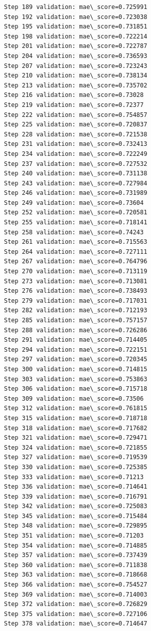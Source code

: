 \documentclass[11pt]{article}
\begin{document}
\begin{Verbatim}[commandchars=\\\{\}]
Step 189 validation: mae\_score=0.725991
Step 192 validation: mae\_score=0.723038
Step 195 validation: mae\_score=0.731851
Step 198 validation: mae\_score=0.722214
Step 201 validation: mae\_score=0.722787
Step 204 validation: mae\_score=0.736593
Step 207 validation: mae\_score=0.723243
Step 210 validation: mae\_score=0.738134
Step 213 validation: mae\_score=0.735702
Step 216 validation: mae\_score=0.73028
Step 219 validation: mae\_score=0.72377
Step 222 validation: mae\_score=0.754857
Step 225 validation: mae\_score=0.720837
Step 228 validation: mae\_score=0.721538
Step 231 validation: mae\_score=0.732413
Step 234 validation: mae\_score=0.722249
Step 237 validation: mae\_score=0.727532
Step 240 validation: mae\_score=0.731138
Step 243 validation: mae\_score=0.727984
Step 246 validation: mae\_score=0.731989
Step 249 validation: mae\_score=0.73604
Step 252 validation: mae\_score=0.720581
Step 255 validation: mae\_score=0.718141
Step 258 validation: mae\_score=0.74243
Step 261 validation: mae\_score=0.715563
Step 264 validation: mae\_score=0.727111
Step 267 validation: mae\_score=0.764796
Step 270 validation: mae\_score=0.713119
Step 273 validation: mae\_score=0.713081
Step 276 validation: mae\_score=0.738493
Step 279 validation: mae\_score=0.717031
Step 282 validation: mae\_score=0.712193
Step 285 validation: mae\_score=0.757157
Step 288 validation: mae\_score=0.726286
Step 291 validation: mae\_score=0.714405
Step 294 validation: mae\_score=0.722151
Step 297 validation: mae\_score=0.720345
Step 300 validation: mae\_score=0.714815
Step 303 validation: mae\_score=0.753863
Step 306 validation: mae\_score=0.715718
Step 309 validation: mae\_score=0.73506
Step 312 validation: mae\_score=0.761815
Step 315 validation: mae\_score=0.718718
Step 318 validation: mae\_score=0.717682
Step 321 validation: mae\_score=0.729471
Step 324 validation: mae\_score=0.721855
Step 327 validation: mae\_score=0.719539
Step 330 validation: mae\_score=0.725385
Step 333 validation: mae\_score=0.71213
Step 336 validation: mae\_score=0.714641
Step 339 validation: mae\_score=0.716791
Step 342 validation: mae\_score=0.725083
Step 345 validation: mae\_score=0.715484
Step 348 validation: mae\_score=0.729895
Step 351 validation: mae\_score=0.71203
Step 354 validation: mae\_score=0.714885
Step 357 validation: mae\_score=0.737439
Step 360 validation: mae\_score=0.711838
Step 363 validation: mae\_score=0.718668
Step 366 validation: mae\_score=0.754527
Step 369 validation: mae\_score=0.714003
Step 372 validation: mae\_score=0.726829
Step 375 validation: mae\_score=0.727106
Step 378 validation: mae\_score=0.714647

\end{Verbatim}
\end{document}
